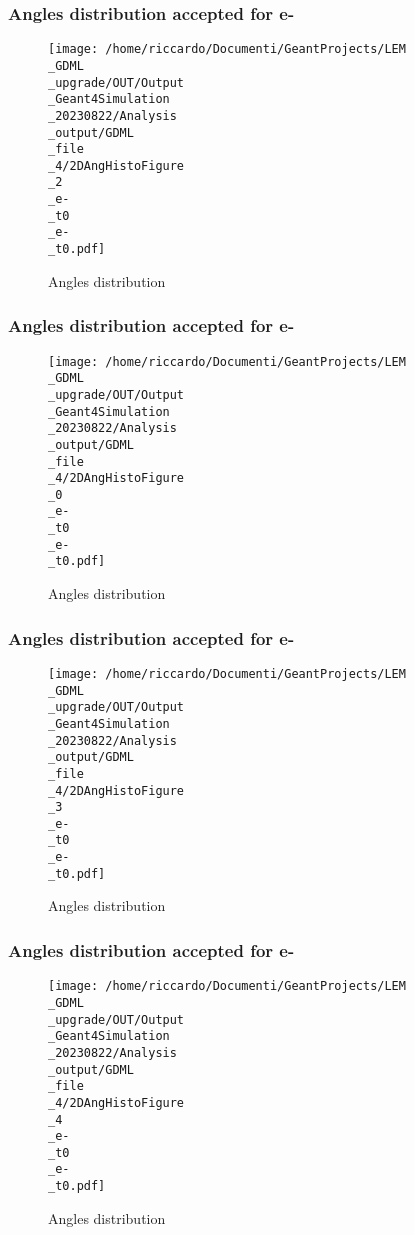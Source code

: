 \documentclass[8pt]{beamer}
\begin{document}
            \begin{frame}
                \frametitle{Angles distribution accepted for e-}
            
        \begin{figure}[h]
            \centering
            \texttt{[image: /home/riccardo/Documenti/GeantProjects/LEM\\\_GDML\\\_upgrade/OUT/Output\\\_Geant4Simulation\\\_20230822/Analysis\\\_output/GDML\\\_file\\\_4/2DAngHistoFigure\\\_2\\\_e-\\\_t0\\\_e-\\\_t0.pdf]}
            \caption{Angles distribution}
        \end{figure}
        
            \end{frame}
            
            \begin{frame}
                \frametitle{Angles distribution accepted for e-}
            
        \begin{figure}[h]
            \centering
            \texttt{[image: /home/riccardo/Documenti/GeantProjects/LEM\\\_GDML\\\_upgrade/OUT/Output\\\_Geant4Simulation\\\_20230822/Analysis\\\_output/GDML\\\_file\\\_4/2DAngHistoFigure\\\_0\\\_e-\\\_t0\\\_e-\\\_t0.pdf]}
            \caption{Angles distribution}
        \end{figure}
        
            \end{frame}
            
            \begin{frame}
                \frametitle{Angles distribution accepted for e-}
            
        \begin{figure}[h]
            \centering
            \texttt{[image: /home/riccardo/Documenti/GeantProjects/LEM\\\_GDML\\\_upgrade/OUT/Output\\\_Geant4Simulation\\\_20230822/Analysis\\\_output/GDML\\\_file\\\_4/2DAngHistoFigure\\\_3\\\_e-\\\_t0\\\_e-\\\_t0.pdf]}
            \caption{Angles distribution}
        \end{figure}
        
            \end{frame}
            
            \begin{frame}
                \frametitle{Angles distribution accepted for e-}
            
        \begin{figure}[h]
            \centering
            \texttt{[image: /home/riccardo/Documenti/GeantProjects/LEM\\\_GDML\\\_upgrade/OUT/Output\\\_Geant4Simulation\\\_20230822/Analysis\\\_output/GDML\\\_file\\\_4/2DAngHistoFigure\\\_4\\\_e-\\\_t0\\\_e-\\\_t0.pdf]}
            \caption{Angles distribution}
        \end{figure}
        
            \end{frame}
            
\end{document}
